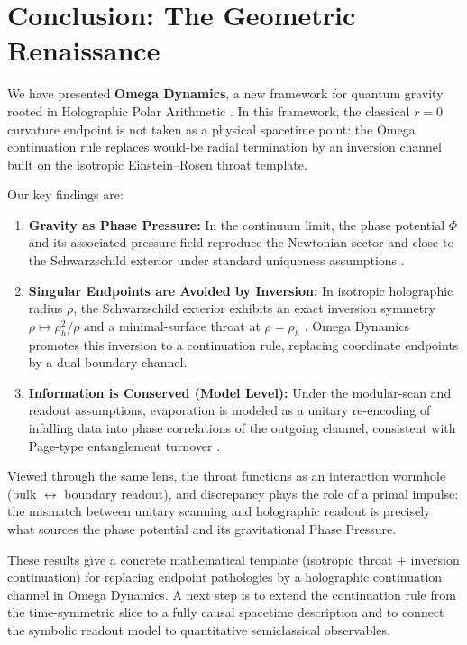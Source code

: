 \section{Conclusion: The Geometric Renaissance}

We have presented \textbf{Omega Dynamics}, a new framework for quantum gravity rooted in Holographic Polar Arithmetic \cite{Ma2025HPA}. In this framework, the classical $r=0$ curvature endpoint is not taken as a physical spacetime point: the Omega continuation rule replaces would-be radial termination by an inversion channel built on the isotropic Einstein--Rosen throat template.

Our key findings are:
\begin{enumerate}
    \item \textbf{Gravity as Phase Pressure:} In the continuum limit, the phase potential $\Phi$ and its associated pressure field reproduce the Newtonian sector and close to the Schwarzschild exterior under standard uniqueness assumptions \cite{Lovelock1971, MisnerThorneWheeler1973, Wald1984}.
    \item \textbf{Singular Endpoints are Avoided by Inversion:} In isotropic holographic radius $\rho$, the Schwarzschild exterior exhibits an exact inversion symmetry $\rho\mapsto\rho_h^2/\rho$ and a minimal-surface throat at $\rho=\rho_h$ \cite{EinsteinRosen1935, Kruskal1960, Wald1984}. Omega Dynamics promotes this inversion to a continuation rule, replacing coordinate endpoints by a dual boundary channel.
    \item \textbf{Information is Conserved (Model Level):} Under the modular-scan and readout assumptions, evaporation is modeled as a unitary re-encoding of infalling data into phase correlations of the outgoing channel, consistent with Page-type entanglement turnover \cite{Page1993, HaydenPreskill2007}.
\end{enumerate}

Viewed through the same lens, the throat functions as an interaction wormhole (bulk $\leftrightarrow$ boundary readout), and discrepancy plays the role of a primal impulse: the mismatch between unitary scanning and holographic readout is precisely what sources the phase potential and its gravitational Phase Pressure.
\par
These results give a concrete mathematical template (isotropic throat + inversion continuation) for replacing endpoint pathologies by a holographic continuation channel in Omega Dynamics. A next step is to extend the continuation rule from the time-symmetric slice to a fully causal spacetime description and to connect the symbolic readout model to quantitative semiclassical observables.

